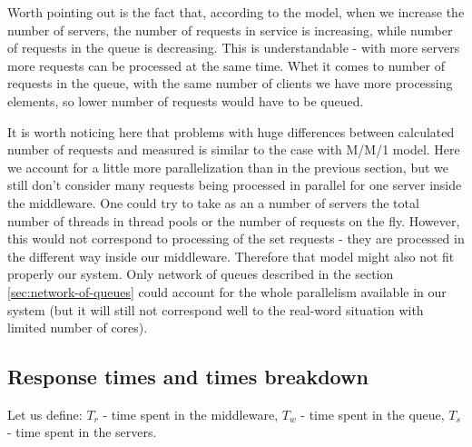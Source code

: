 \documentclass[11pt]{article}
\begin{document}
Worth pointing out is the fact that, according to the model, when we increase the number of servers, the number of requests in service is increasing, while number of requests in the queue is decreasing. This is understandable - with more servers more requests can be processed at the same time. Whet it comes to number of requests in the queue, with the same number of clients we have more processing elements, so lower number of requests would have to be queued.


It is worth noticing here that problems with huge differences between calculated number of requests and measured is similar to the case with M/M/1 model. Here we account for a little more parallelization than in the previous section, but we still don't consider many requests being processed in parallel for one server inside the middleware. One could try to take as an a number of servers the total number of threads in thread pools or the number of requests on the fly. However, this would not correspond to processing of the set requests - they are processed in the different way inside our middleware. Therefore that model might also not fit properly our system. Only network of queues described in the section \ref{sec:network-of-queues} could account for the whole parallelism available in our system (but it will still not correspond well to the real-word situation with limited number of cores).

\subsection{Response times and times breakdown}

Let us define: 
$T_r$ - time spent in the middleware, $T_w$ - time spent in the queue, $T_s$ - time spent in the servers. 
\end{document}
